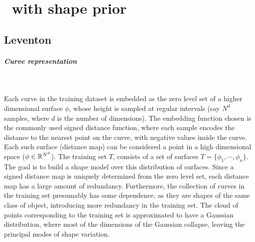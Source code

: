 
\newpage
\chapter{\Ls~with shape prior}
\label{chap:shape}

\section[Leventon \etal]{Leventon \etal \cite{Leventon2000}}
\label{sec:shape-leventon}

\paragraph{Curve representation}
~\par \vspace{0.3cm}

Each curve in the training dataset is embedded as the zero level set of a higher dimensional surface $\phi$, whose height is sampled at regular intervals (say $N^d$ samples, where $d$ is the number of dimensions). The embedding function chosen is the commonly used signed distance function, where each sample encodes the distance to the nearest point on the curve, with negative values inside the curve. Each such surface (distance map) can be considered a point in a high dimensional space ($\phi \in \mathbb{R}^{N^d}$). The training set $T$, consists of a set of surfaces $T = \{\phi_1, \cdots, \phi_n \}$. The goal is to build a shape model over this distribution of surfaces. Since a signed distance map is uniquely determined from the zero level set, each distance map has a large amount of redundancy. Furthermore, the collection of curves in the training set presumably has some dependence, as they are shapes of the same class of object, introducing more redundancy in the training set. The cloud of points corresponding to the training set is approximated to have a Gaussian distribution, where most of the dimensions of the Gaussian collapse, leaving the principal modes of shape variation.

